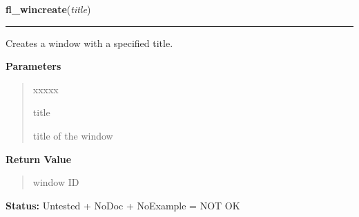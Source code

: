 \hspace{.8\funcindent}\begin{boxedminipage}{\funcwidth}

    \raggedright \textbf{fl\_wincreate}(\textit{title})

    \vspace{-1.5ex}

    \rule{\textwidth}{0.5\fboxrule}
\setlength{\parskip}{2ex}
    Creates a window with a specified title.

\setlength{\parskip}{1ex}
      \textbf{Parameters}
      \vspace{-1ex}

      \begin{quote}
        \begin{Ventry}{xxxxx}

          \item[title]

          title of the window

        \end{Ventry}

      \end{quote}

      \textbf{Return Value}
    \vspace{-1ex}

      \begin{quote}
      window ID

      \end{quote}

\textbf{Status:} Untested + NoDoc + NoExample = NOT OK



    \end{boxedminipage}

    \label{xformslib:library:fl_winshow}

    \vspace{0.5ex}

